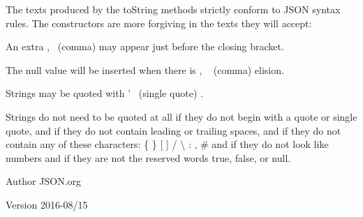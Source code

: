 The texts produced by the {\ttfamily to\-String} methods strictly conform to J\-S\-O\-N syntax rules. The constructors are more forgiving in the texts they will accept\-: 
\begin{DoxyItemize}
\item An extra {\ttfamily ,}~
\footnotesize (comma)
\normalsize  may appear just before the closing bracket. 
\item The {\ttfamily null} value will be inserted when there is {\ttfamily ,} ~
\footnotesize (comma)
\normalsize  elision. 
\item Strings may be quoted with {\ttfamily '}~
\footnotesize (single quote)
\normalsize . 
\item Strings do not need to be quoted at all if they do not begin with a quote or single quote, and if they do not contain leading or trailing spaces, and if they do not contain any of these characters\-: {\ttfamily \{ \} \mbox{[} \mbox{]} / \textbackslash{} \-: , \#} and if they do not look like numbers and if they are not the reserved words {\ttfamily true}, {\ttfamily false}, or {\ttfamily null}. 
\end{DoxyItemize}

\begin{DoxyAuthor}{Author}
J\-S\-O\-N.\-org 
\end{DoxyAuthor}
\begin{DoxyVersion}{Version}
2016-\/08/15 
\end{DoxyVersion}


